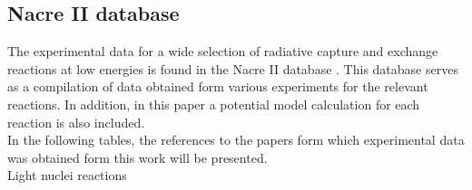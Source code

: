 \documentclass[openany]{book}
\begin{document}
\subsection{Nacre II database} \label{sub:nacreII}

The experimental data for a wide selection of radiative capture and exchange reactions at low energies is found in the Nacre II database \cite{xu_takahashi_goriely_arnould_ohta_utsunomiya_2013}. This database serves as a compilation of data obtained form various experiments for the relevant reactions. In addition, in this paper a potential model calculation for each reaction is also included.\\

In the following tables, the references to the papers form which experimental data was obtained form this work will be presented. \\

Light nuclei reactions
\end{document}
